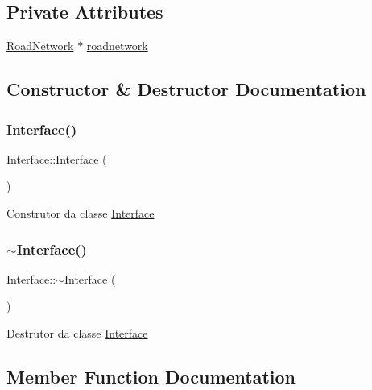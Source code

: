 \subsection*{Private Attributes}
\begin{DoxyCompactItemize}
\item 
\mbox{\hyperlink{class_road_network}{Road\+Network}} $\ast$ \mbox{\hyperlink{class_interface_aae76b1bb86e685e441c21f5f5b68ef99}{roadnetwork}}
\end{DoxyCompactItemize}


\subsection{Constructor \& Destructor Documentation}
\mbox{\label{class_interface_a4406d74c75bdfe150bf72be1f1cda8b1}} 
\subsubsection{\texorpdfstring{Interface()}{Interface()}}
{\footnotesize\ttfamily Interface\+::\+Interface (\begin{DoxyParamCaption}{ }\end{DoxyParamCaption})}

Construtor da classe \mbox{\hyperlink{class_interface}{Interface}} \mbox{\label{class_interface_a19179888f29f18f1be54a3dfe98f68c0}} 
\subsubsection{\texorpdfstring{$\sim$\+Interface()}{~Interface()}}
{\footnotesize\ttfamily Interface\+::$\sim$\+Interface (\begin{DoxyParamCaption}{ }\end{DoxyParamCaption})\hspace{0.3cm}{\ttfamily [virtual]}}

Destrutor da classe \mbox{\hyperlink{class_interface}{Interface}} 

\subsection{Member Function Documentation}
\mbox{\label{class_interface_a12b0f4dba3448926ac90f2f0ca6ad5b6}} 
